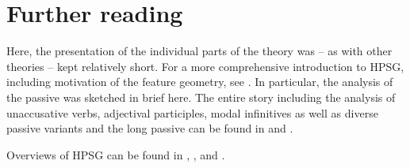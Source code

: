\section*{Further reading}

Here, the presentation of the individual parts of the theory was -- as with other theories -- kept relatively short. For a more comprehensive
introduction to HPSG, including motivation of the feature geometry, see .\nocite{Mueller99a,Mueller2002b}
In particular, the analysis of the passive was sketched in brief here. The entire story including the analysis of unaccusative verbs, adjectival participles,
modal infinitives as well as diverse passive variants and the long passive can be found in 
 and .

Overviews of HPSG can be found in , ,  and .



